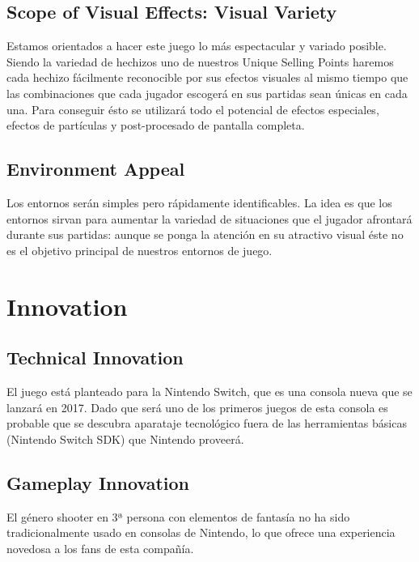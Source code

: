 \documentclass[12pt]{article}
\begin{document}
\subsection{Scope of Visual Effects: Visual Variety}

Estamos orientados a hacer este juego lo más espectacular y variado posible. Siendo la variedad de hechizos uno de nuestros Unique Selling Points haremos cada hechizo fácilmente reconocible por sus efectos visuales al mismo tiempo que las combinaciones que cada jugador escogerá en sus partidas sean únicas en cada una. Para conseguir ésto se utilizará todo el potencial de efectos especiales, efectos de partículas y post-procesado de pantalla completa.

\subsection{Environment Appeal}

Los entornos serán simples pero rápidamente identificables. La idea es que los entornos sirvan para aumentar la variedad de situaciones que el jugador afrontará durante sus partidas: aunque se ponga la atención en su atractivo visual éste no es el objetivo principal de nuestros entornos de juego.

\newpage  

\section{Innovation}        

\subsection{Technical Innovation}

El juego está planteado para la Nintendo Switch, que es una consola nueva que se lanzará en 2017. Dado que será uno de los primeros juegos de esta consola es probable que se descubra aparataje tecnológico fuera de las herramientas básicas (Nintendo Switch SDK) que Nintendo proveerá.

\subsection{Gameplay Innovation}

El género shooter en 3ª persona con elementos de fantasía no ha sido tradicionalmente usado en consolas de Nintendo, lo que ofrece una experiencia novedosa a los fans de esta compañía.
\end{document}
